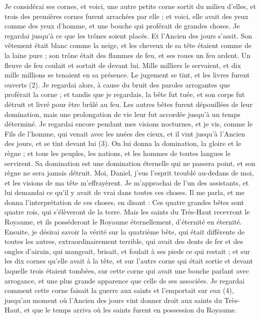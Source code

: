 \begin{multicols}{2}
Je considérai ses cornes, et voici, une autre petite corne sortit du milieu d’elles, et trois des premières cornes furent arrachées par elle ; et voici, elle avait des yeux comme des yeux d’homme, et une bouche qui proférait de grandes choses.
Je regardai jusqu'à ce que les trônes soient placés. Et l'Ancien des jours s'assit. Son vêtement était blanc comme la neige, et les cheveux de sa tête étaient comme de la laine pure ; son trône était des flammes de feu, et ses roues un feu ardent.
Un fleuve de feu coulait et sortait de devant lui. Mille milliers le servaient, et dix mille millions se tenaient en sa présence.  Le jugement se tint, et les livres furent ouverts (2).
Je regardai alors, à cause du bruit des paroles arrogantes que proférait la corne ; et tandis que je regardais, la bête fut tuée, et son corps fut détruit et livré pour être brûlé au feu.
Les autres bêtes furent dépouillées de leur domination, mais une prolongation de vie leur fut accordée jusqu'à un temps déterminé.
Je regardai encore pendant mes visions nocturnes, et je vis, comme le Fils de l'homme, qui venait avec les nuées des cieux, et il vint jusqu'à l'Ancien des jours, et se tint devant lui (3).
On lui donna la domination, la gloire et le règne ; et tous les peuples, les nations, et les hommes de toutes langues le servirent. Sa domination est une domination éternelle qui ne passera point, et son règne ne sera jamais détruit.
Moi, Daniel, j’eus l'esprit troublé au-dedans de moi, et les visions de ma tête m’effrayèrent.
Je m'approchai de l'un des assistants, et lui demandai ce qu’il y avait de vrai dans toutes ces choses.  Il me parla, et me donna l'interprétation de ces choses, en disant :
Ces quatre grandes bêtes sont quatre rois, qui s'élèveront de la terre.
Mais les saints du Très-Haut recevront le Royaume, et ils posséderont le Royaume éternellement, d’éternité en éternité.
Ensuite, je désirai savoir la vérité sur la quatrième bête, qui était différente de toutes les autres, extraordinairement terrible, qui avait des dents de fer et des ongles d'airain, qui mangeait, brisait, et foulait à ses pieds ce qui restait ;
et sur les dix cornes qu’elle avait à la tête, et sur l'autre corne qui était sortie et devant laquelle trois étaient tombées, sur cette corne qui avait une bouche parlant avec arrogance, et une plus grande apparence que celle de ses associées.
Je regardai comment cette corne faisait la guerre aux saints et l’emportait sur eux (4),
jusqu'au moment où l'Ancien des jours vint donner droit aux saints du Très-Haut, et que le temps arriva où les saints furent en possession du Royaume.

\end{multicols}
